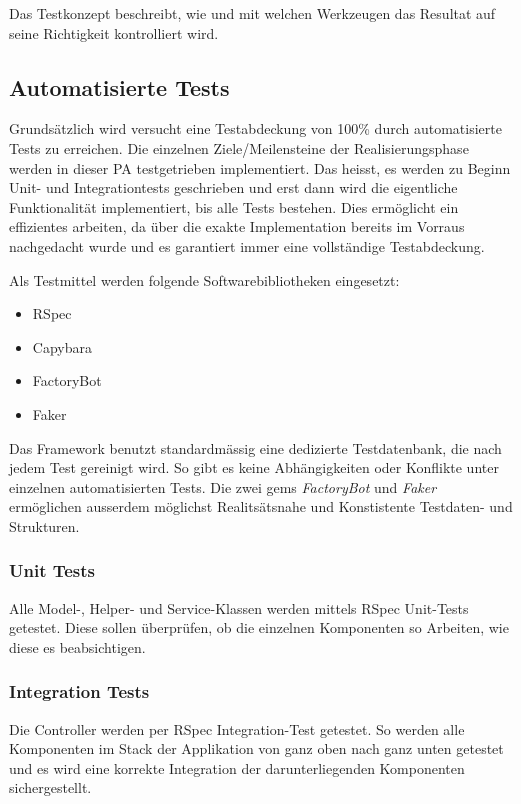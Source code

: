 Das Testkonzept beschreibt, wie und mit welchen Werkzeugen das Resultat auf seine Richtigkeit kontrolliert wird.

\subsection{Automatisierte Tests}

Grundsätzlich wird versucht eine Testabdeckung von 100\% durch automatisierte Tests zu erreichen. Die einzelnen
Ziele/Meilensteine der Realisierungsphase werden in dieser PA testgetrieben implementiert. Das heisst, es werden zu Beginn
Unit- und Integrationtests geschrieben und erst dann wird die eigentliche Funktionalität implementiert, bis alle Tests bestehen. Dies ermöglicht
ein effizientes arbeiten, da über die exakte Implementation bereits im Vorraus nachgedacht wurde und es garantiert immer eine vollständige Testabdeckung.

Als Testmittel werden folgende Softwarebibliotheken eingesetzt:
\begin{itemize}
    \item RSpec
    \item Capybara
    \item FactoryBot
    \item Faker
\end{itemize}

Das Framework benutzt standardmässig eine dedizierte Testdatenbank, die nach jedem Test gereinigt wird. So gibt es keine Abhängigkeiten
oder Konflikte unter einzelnen automatisierten Tests. Die zwei gems \emph{FactoryBot} und \emph{Faker} ermöglichen ausserdem möglichst
Realitsätsnahe und Konstistente Testdaten- und Strukturen.

\subsubsection{Unit Tests}
Alle Model-, Helper- und Service-Klassen werden mittels RSpec Unit-Tests getestet. Diese sollen überprüfen,
ob die einzelnen Komponenten so Arbeiten, wie diese es beabsichtigen.

\subsubsection{Integration Tests}
Die Controller werden per RSpec Integration-Test getestet. So werden alle Komponenten im Stack der Applikation von ganz oben
nach ganz unten getestet und es wird eine korrekte Integration der darunterliegenden Komponenten sichergestellt.

